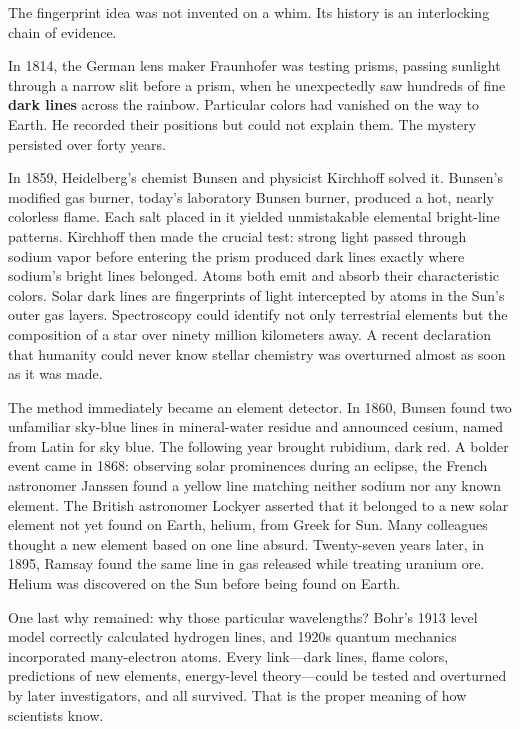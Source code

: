 \begin{zhengju}
The fingerprint idea was not invented on a whim. Its history is an interlocking chain of evidence.

In 1814, the German lens maker Fraunhofer was testing prisms, passing sunlight through a narrow slit before a prism, when he unexpectedly saw hundreds of fine \textbf{dark lines} across the rainbow. Particular colors had vanished on the way to Earth. He recorded their positions but could not explain them. The mystery persisted over forty years.

In 1859, Heidelberg's chemist Bunsen and physicist Kirchhoff solved it. Bunsen's modified gas burner, today's laboratory Bunsen burner, produced a hot, nearly colorless flame. Each salt placed in it yielded unmistakable elemental bright-line patterns. Kirchhoff then made the crucial test: strong light passed through sodium vapor before entering the prism produced dark lines exactly where sodium's bright lines belonged. Atoms both emit and absorb their characteristic colors. Solar dark lines are fingerprints of light intercepted by atoms in the Sun's outer gas layers. Spectroscopy could identify not only terrestrial elements but the composition of a star over ninety million kilometers away. A recent declaration that humanity could never know stellar chemistry was overturned almost as soon as it was made.

The method immediately became an element detector. In 1860, Bunsen found two unfamiliar sky-blue lines in mineral-water residue and announced cesium, named from Latin for sky blue. The following year brought rubidium, dark red. A bolder event came in 1868: observing solar prominences during an eclipse, the French astronomer Janssen found a yellow line matching neither sodium nor any known element. The British astronomer Lockyer asserted that it belonged to a new solar element not yet found on Earth, helium, from Greek for Sun. Many colleagues thought a new element based on one line absurd. Twenty-seven years later, in 1895, Ramsay found the same line in gas released while treating uranium ore. Helium was discovered on the Sun before being found on Earth.

One last why remained: why those particular wavelengths? Bohr's 1913 level model correctly calculated hydrogen lines, and 1920s quantum mechanics incorporated many-electron atoms. Every link---dark lines, flame colors, predictions of new elements, energy-level theory---could be tested and overturned by later investigators, and all survived. That is the proper meaning of how scientists know.
\end{zhengju}

